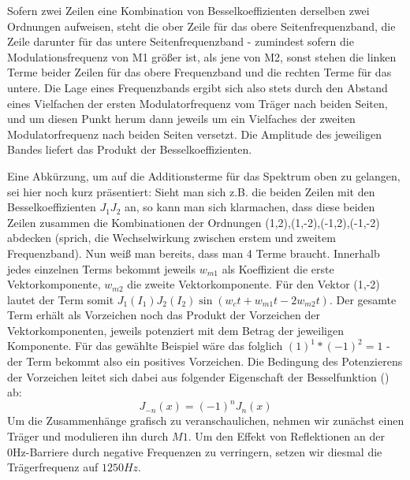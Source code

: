 Sofern zwei Zeilen eine Kombination von Besselkoeffizienten derselben zwei Ordnungen aufweisen, steht die ober Zeile für das obere Seitenfrequenzband, die Zeile darunter für das untere Seitenfrequenzband - zumindest sofern die Modulationsfrequenz von M1 größer ist, als jene von M2, sonst stehen die linken Terme beider Zeilen für das obere Frequenzband und die rechten Terme für das untere. Die Lage eines Frequenzbands ergibt sich also stets durch den Abstand eines Vielfachen der ersten Modulatorfrequenz vom Träger nach beiden Seiten, und um diesen Punkt herum dann jeweils um ein Vielfaches der zweiten Modulatorfrequenz nach beiden Seiten versetzt. Die Amplitude des jeweiligen Bandes liefert das Produkt der Besselkoeffizienten. 

Eine Abkürzung, um auf die Additionsterme für das Spektrum oben zu gelangen, sei hier noch kurz präsentiert: Sieht man sich z.B. die beiden Zeilen mit den Besselkoeffizienten \begin{math} J_1J_2 \end{math} an, so kann man sich klarmachen, dass diese beiden Zeilen zusammen die Kombinationen der Ordnungen (1,2),(1,-2),(-1,2),(-1,-2) abdecken (sprich, die Wechselwirkung zwischen erstem und zweitem Frequenzband). Nun weiß man bereits, dass man 4 Terme braucht. Innerhalb jedes einzelnen Terms bekommt jeweils \begin{math} w_{m1} \end{math} als Koeffizient die erste Vektorkomponente, \begin{math} w_{m2} \end{math} die zweite Vektorkomponente. Für den Vektor (1,-2) lautet der Term somit \begin{math} J_1(I_1)J_2(I_2)\sin(w_ct + w_{m1}t - 2w_{m2}t) \end{math}. Der gesamte Term erhält als Vorzeichen noch das Produkt der Vorzeichen der Vektorkomponenten, jeweils potenziert mit dem Betrag der jeweiligen Komponente. Für das gewählte Beispiel wäre das folglich \begin{math} (1)^1*(-1)^2 = 1 \end{math} - der Term bekommt also ein positives Vorzeichen. Die Bedingung des Potenzierens der Vorzeichen leitet sich dabei aus folgender Eigenschaft der Besselfunktion (\cite[S.358, Satz~9.1.5]{abramowitz}) ab:
\begin{equation}
J_{-n}(x) = (-1)^nJ_n(x)
\end{equation}
Um die Zusammenhänge grafisch zu veranschaulichen, nehmen wir zunächst einen Träger und modulieren ihn durch $M1$. Um den Effekt von Reflektionen an der 0Hz-Barriere durch negative Frequenzen zu verringern, setzen wir diesmal die Trägerfrequenz auf $1250Hz$. 
